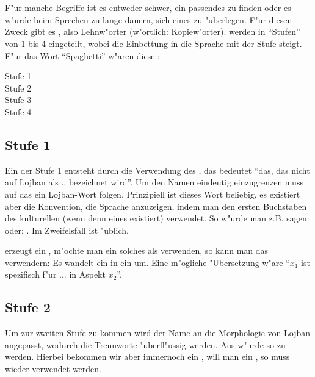 \section{}
F"ur manche Begriffe ist es entweder schwer, ein passendes  zu finden oder es w"urde beim Sprechen zu lange dauern,
sich eines zu "uberlegen. F"ur diesen Zweck gibt es , also Lehnw"orter (w"ortlich: Kopiew"orter).
 werden in ``Stufen'' von 1 bis 4 eingeteilt, wobei die Einbettung in die Sprache mit der Stufe steigt.
F"ur das Wort ``Spaghetti'' w"aren diese :
\begin{description}
\item[Stufe 1] 
\item[Stufe 2] 
\item[Stufe 3] 
\item[Stufe 4] 
\end{description}

\subsection{Stufe 1}
Ein  der Stufe 1 entsteht durch die Verwendung des  , das bedeutet ``das, das nicht auf Lojban als .. bezeichnet wird''. Um den Namen eindeutig einzugrenzen muss auf das  ein Lojban-Wort folgen. Prinzipiell ist dieses Wort beliebig, es 
existiert aber die Konvention, die Sprache anzuzeigen, indem man den ersten Buchstaben des kulturellen  (wenn denn eines existiert)
verwendet. So w"urde man z.B. sagen:  oder: . Im Zweifelsfall ist  "ublich.

 erzeugt ein , m"ochte man ein solches  als  verwenden, so kann man das 
 verwendern: Es wandelt ein  in ein  um. Eine m"ogliche "Ubersetzung w"are ``$x_1$ ist spezifisch f"ur ...
in Aspekt $x_2$''.

\subsection{Stufe 2}
Um zur zweiten Stufe zu kommen wird der Name an die Morphologie von Lojban angepasst, wodurch die Trennworte "uberfl"ussig werden. Aus  w"urde so zu  werden.
Hierbei bekommen wir aber immernoch ein , will man ein , so muss wieder  verwendet werden.


